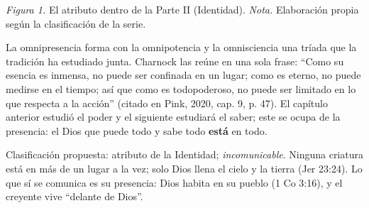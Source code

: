 \documentclass[11pt,letterpaper]{article}
\newcommand{\destacar}[1]{\textbf{\textcolor{azul}{#1}}}
\begin{document}
\begin{center}
\par
{\footnotesize\color{gris}\textit{Figura 1.} El atributo dentro de la Parte II (Identidad). \textit{Nota.} Elaboración propia según la clasificación de la serie.}
\end{center}

La omnipresencia forma con la omnipotencia y la omnisciencia una tríada que la tradición ha estudiado junta. Charnock las reúne en una sola frase: ``Como su esencia es inmensa, no puede ser confinada en un lugar; como es eterno, no puede medirse en el tiempo; así que como es todopoderoso, no puede ser limitado en lo que respecta a la acción'' (citado en Pink, 2020, cap. 9, p. 47). El capítulo anterior estudió el poder y el siguiente estudiará el saber; este se ocupa de la presencia: el Dios que puede todo y sabe todo \destacar{está} en todo.

\begin{nota}[Precisión]
Clasificación propuesta: atributo de la Identidad; \emph{incomunicable}. Ninguna criatura está en más de un lugar a la vez; solo Dios llena el cielo y la tierra (Jer 23:24). Lo que sí se comunica es su presencia: Dios habita en su pueblo (1 Co 3:16), y el creyente vive ``delante de Dios''.
\end{nota}
\end{document}

